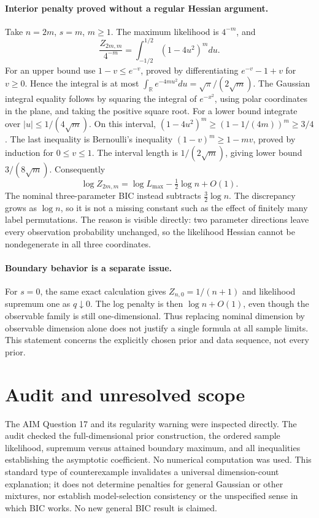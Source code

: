 \documentclass[11pt]{article}
\begin{document}
\paragraph{Interior penalty proved without a regular Hessian argument.}
Take $n=2m$, $s=m$, $m\ge1$. The maximum likelihood is $4^{-m}$, and
\[
\frac{Z_{2m,m}}{4^{-m}}=
 \int_{-1/2}^{1/2}(1-4u^2)^m du.
\]
For an upper bound use $1-v\le e^{-v}$, proved by differentiating
$e^{-v}-1+v$ for $v\ge0$. Hence the integral is at most
$\int_{\mathbb R}e^{-4mu^2}du=\sqrt\pi/(2\sqrt m)$.
The Gaussian integral equality follows by squaring the integral of
$e^{-x^2}$, using polar coordinates in the plane, and taking the
positive square root. For a lower bound integrate over
$|u|\le1/(4\sqrt m)$. On this interval,
$(1-4u^2)^m\ge(1-1/(4m))^m\ge3/4$.
The last inequality is Bernoulli's inequality
$(1-v)^m\ge1-mv$, proved by induction for $0\le v\le1$.
The interval length is $1/(2\sqrt m)$, giving lower bound
$3/(8\sqrt m)$. Consequently
\[
\log Z_{2m,m}=\log L_{\max}-\tfrac12\log n+O(1).
\]
The nominal three-parameter BIC instead subtracts $\tfrac32\log n$.
The discrepancy grows as $\log n$, so it is not a missing constant
such as the effect of finitely many label permutations.
The reason is visible directly: two parameter directions leave every
observation probability unchanged, so the likelihood Hessian cannot be
nondegenerate in all three coordinates.

\paragraph{Boundary behavior is a separate issue.}
For $s=0$, the same exact calculation gives $Z_{n,0}=1/(n+1)$ and
likelihood supremum one as $q\downarrow0$. The log penalty is then
$\log n+O(1)$, even though the observable family is still one-dimensional.
Thus replacing nominal dimension by observable dimension alone does not
justify a single formula at all sample limits. This statement concerns
the explicitly chosen prior and data sequence, not every prior.

\section{Audit and unresolved scope}
The AIM Question 17 and its regularity warning were inspected directly.
The audit checked the full-dimensional prior construction, the ordered
sample likelihood, supremum versus attained boundary maximum, and all
inequalities establishing the asymptotic coefficient. No numerical
computation was used. This standard type of counterexample invalidates
a universal dimension-count explanation; it does not determine penalties
for general Gaussian or other mixtures, nor establish model-selection
consistency or the unspecified sense in which BIC works. No new general
BIC result is claimed.
\end{document}
